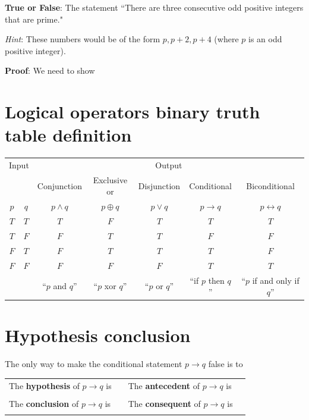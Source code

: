 \documentclass[12pt, oneside]{article}
\begin{document}
{\bf True or False}: The statement ``There are three consecutive odd positive integers that are prime."

{\it Hint}: These numbers would be of the form $p, p+2, p+4$ (where $p$ is an odd positive integer).

{\bf Proof}: We need to show \underline{}

\vspace{200pt}
 \vfill
\section*{Logical operators binary truth table definition}


\begin{center}
    \begin{tabular}{cc||c|c|c|c|c}
    \multicolumn{2}{c||}{Input}  & \multicolumn{5}{c}{Output} \\
     & & Conjunction &  Exclusive or & Disjunction  &  Conditional & Biconditional  \\
    $p$ & $q$ & $p \wedge q$ &  $p  \oplus  q$ & $p \vee  q$ & $p \to q$ & $p \leftrightarrow q$\\
    \hline
    $T$ & $T$ & $T$ & $F$ & $T$ & $T$& $T$\\
    $T$ & $F$ & $F$ & $T$ & $T$ & $F$& $F$\\
    $F$ & $T$ & $F$ & $T$ & $T$ & $T$& $F$\\
    $F$ & $F$ & $F$ & $F$ & $F$ & $T$& $T$\\
    \hline
    && ``$p$ and $q$'' & ``$p$ xor $q$'' & ``$p$ or $q$'' & ``if $p$ then $q$'' & ``$p$ if and only if $q$''
    \end{tabular}
\end{center}
     \vfill
\section*{Hypothesis conclusion}


The only way to make  the conditional statement $p \to q$ false is to \underline{\phantom{\hspace{3in}}}\\

\begin{tabular}{llll}
The {\bf  hypothesis}  of $p \to q$ is  &\underline{\phantom{\hspace{1in}}} &
The {\bf  antecedent}  of $p \to q$ is  &\underline{\phantom{\hspace{1in}}} \\
&&&  \\
The {\bf  conclusion}  of $p \to q$ is & \underline{\phantom{\hspace{1in}}}&
The {\bf  consequent}  of $p \to q$ is & \underline{\phantom{\hspace{1in}}}\\
&&&  \\
\end{tabular}
 \vfill
\end{document}
